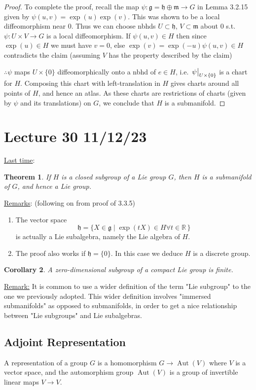 \documentclass[12pt,a4paper]{article}
\newcommand{\rR}{\ensuremath{\mathbb{R}\,}}
\newcommand{\lalg}{\ensuremath{\mathfrak{g}}}
\newcommand{\lall}[1]{\ensuremath{\mathfrak{#1}}}
\newcommand{\ul}[1]{\underline{#1}}
\newtheorem{thm}{Theorem}[subsubsection]
\newtheorem{cor}[thm]{Corollary}
\begin{document}
\begin{proof}
To complete the proof, recall the map $\psi:\lalg = \lall{h}\oplus \lall{m}\to G$ in Lemma 3.2.15 given by $\psi(u,v)=\exp(u)\exp(v)$. This was shown to be a local diffeomorphism near $0$. Thus we can choose nbhds $U\subset \lall{h}$, $V\subset \lall{m}$ about $0$ s.t. $\psi:U\times V\to G$ is a local diffeomorphism. If $\psi(u,v)\in H$ then since $\exp(u)\in H$ we must have $v=0$, else $\exp(v)=\exp(-u)\psi(u,v)\in H$ contradicts the claim (assuming $V$ has the property described by the claim)

$\therefore \psi$ maps $U\times \{0\}$ diffeomorphically onto a nbhd of $e\in H$, i.e. $\eval{\psi}_{U\times \{0\}}$ is a chart for $H$. Composing this chart with left-translation in $H$ gives charts around all points of $H$, and hence an atlas. As these charts are restrictions of charts (given by $\psi$ and its translations) on $G$, we conclude that $H$ is a submanifold.
\end{proof}

\section{Lecture 30 11/12/23}
\ul{Last time}:
\addtocounter{thm}{-1}
\begin{thm}
If $H$ is a closed subgroup of a Lie group $G$, then $H$ is a submanifold of $G$, and hence a Lie group.
\end{thm}

\ul{Remarks}: (following on from proof of 3.3.5)
\begin{enumerate}
\item The vector space 
\[\lall{h}=\{X\in \lalg\mid \exp(tX)\in H \forall t \in \rR\}\]
is actually a Lie subalgebra, namely the Lie algebra of $H$.
\item The proof also works if $\lall{h}=\{0\}$. In this case we deduce $H$ is a discrete group.
\end{enumerate}
\begin{cor}
A zero-dimensional subgroup of a compact Lie group is finite.
\end{cor}
\ul{Remark:} It is common to use a wider definition of the term "Lie subgroup" to the one we previously adopted. This wider definition involves "immersed submanifolds" as opposed to submanifolds, in order to get a nice relationship between "Lie subgroups" and Lie subalgebras.
\subsection{Adjoint Representation}
A representation of a group $G$ is a homomorphism $G\to \operatorname{Aut}(V)$ where $V$ is a vector space, and the automorphism group $\operatorname{Aut}(V)$ is a group of invertible linear maps $V\to V$.
\end{document}
